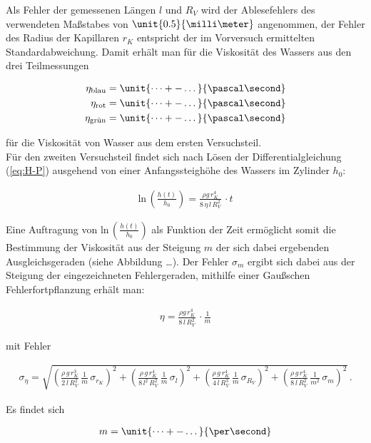 \noindent Als Fehler der gemessenen Längen $l$ und $R_V$ wird der Ablesefehlers des verwendeten Maßstabes von $\unit{0.5}{\milli\meter}$ angenommen, der Fehler des Radius der Kapillaren $r_K$ entspricht der im Vorversuch ermittelten Standardabweichung. Damit erhält man für die Viskosität des Wassers aus den drei Teilmessungen

\begin{align*}
\eta_{\text{blau}} &= \unit{\dots+-\dots}{\pascal\second}\\
\eta_{\text{rot}} &= \unit{\dots+-\dots}{\pascal\second}\\
\eta_{\text{gr\"un}} &= \unit{\dots+-\dots}{\pascal\second}
\end{align*}

\noindent für die Viskosität von Wasser aus dem ersten Versuchsteil.\\
Für den zweiten Versuchsteil findet sich nach Lösen der Differentialgleichung (\ref{eq:H-P}) ausgehend von einer Anfangssteighöhe des Wassers im Zylinder $h_0$:

\begin{align}
\text{ln}\,\left(\frac{h(t)}{h_0}\right) = \frac{\rho g \, r_K^4}{8\,\eta\, l \, R_V^2}\,\cdot t
\end{align}

\noindent Eine Auftragung von $\text{ln}\,\left(\frac{h(t)}{h_0}\right)$ als Funktion der Zeit ermöglicht somit die Bestimmung der Viskosität aus der Steigung $m$ der sich dabei ergebenden Ausgleichsgeraden (siehe Abbildung \dots). Der Fehler $\sigma_m$ ergibt sich dabei aus der Steigung der eingezeichneten Fehlergeraden, mithilfe einer Gaußschen Fehlerfortpflanzung erhält man:

\begin{align}
\eta = \frac{\rho g \, r_K^4}{8\, l \, R_V^2}\,\cdot\frac{1}{m}
\end{align}

\noindent mit Fehler

\begin{align}
\sigma_{\eta} = \sqrt{\left(\frac{\rho\, g\, r_K^3}{2\, l \, R_V^2}\,\frac{1}{m}\,\sigma_{r_K}\right)^2 + \left(\frac{\rho\, g\, r_K^4}{8\, l^2 \, R_V^2}\,\frac{1}{m}\,\sigma_l\right)^2 + \left(\frac{\rho\, g\, r_K^4}{4\, l \, R_V^3}\,\frac{1}{m}\,\sigma_{R_V}\right)^2 + \left(\frac{\rho\, g\, r_K^4}{8\, l \, R_V^2}\,\frac{1}{m^2}\,\sigma_m\right)^2}\, .
\end{align}

\noindent Es findet sich

\begin{align*}
m = \unit{\dots+-\dots}{\per\second}
\end{align*}

